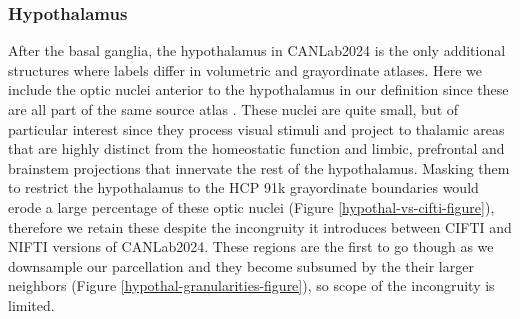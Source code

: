 \documentclass[10pt,letterpaper]{article}
\begin{document}
\subsubsection{Hypothalamus} 
After the basal ganglia, the hypothalamus in CANLab2024 is the only additional structures where labels differ in volumetric and grayordinate atlases. Here we include the optic nuclei anterior to the hypothalamus in our definition since these are all part of the same source atlas . These nuclei are quite small, but of particular interest since they process visual stimuli and project to thalamic areas that are highly distinct from the homeostatic function and limbic, prefrontal and brainstem projections that innervate the rest of the hypothalamus. Masking them to restrict the hypothalamus to the HCP 91k grayordinate boundaries would erode a large percentage of these optic nuclei (Figure \ref{hypothal-vs-cifti-figure}), therefore we retain these despite the incongruity it introduces between CIFTI and NIFTI versions of CANLab2024. These regions are the first to go though as we downsample our parcellation and they become subsumed by the their larger neighbors (Figure \ref{hypothal-granularities-figure}), so scope of the incongruity is limited.
\end{document}
